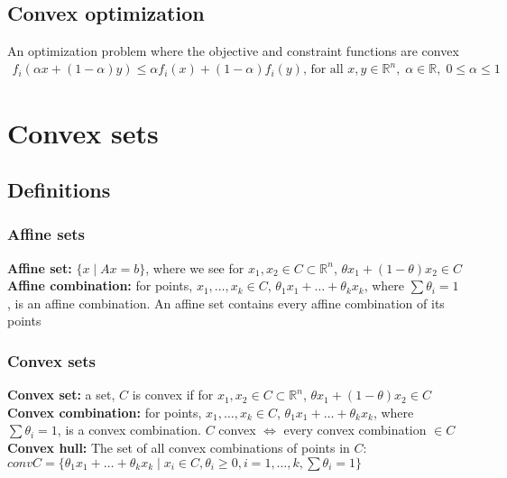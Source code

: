 \documentclass{article}
\begin{document}
\subsection{Convex optimization}
An optimization problem where the objective and constraint functions are convex
\begin{align*}
  f_i(\alpha x + (1-\alpha) y) \leq \alpha f_i(x) + (1 - \alpha) f_i(y) \textrm{, for all } x,y \in \mathbb{R}^n, \; \alpha \in \mathbb{R}, \; 0 \leq \alpha \leq 1
\end{align*}

\section{Convex sets}
\subsection{Definitions}
\subsubsection{Affine sets}
\textbf{Affine set:} $\{x \mid Ax = b\}$, where we see for $x_1, x_2 \in C \subset \mathbb{R}^n$, $\theta x_1 + (1-\theta)x_2 \in C$\\
\textbf{Affine combination:} for points, $x_1, \dots, x_k \in C$, $\theta_1x_1 + \dots + \theta_kx_k$, where $\sum \theta_i = 1$, is an affine combination. An affine set contains every affine combination of its points

\subsubsection{Convex sets}
\textbf{Convex set:} a set, $C$ is convex if for $x_1, x_2 \in C \subset \mathbb{R}^n$, $\theta x_1 + (1-\theta)x_2 \in C$\\
\textbf{Convex combination:} for points, $x_1, \dots, x_k \in C$, $\theta_1x_1 + \dots + \theta_kx_k$, where $\sum \theta_i = 1$, is a convex combination. $C$ convex $\Leftrightarrow$ every convex combination $\in C$\\
\textbf{Convex hull:} The set of all convex combinations of points in $C$: $convC=\{\theta_1x_1+\dots+\theta_kx_k \mid x_i \in C, \theta_i \geq 0, i=1,\dots,k, \sum \theta_i = 1 \}$
\end{document}
